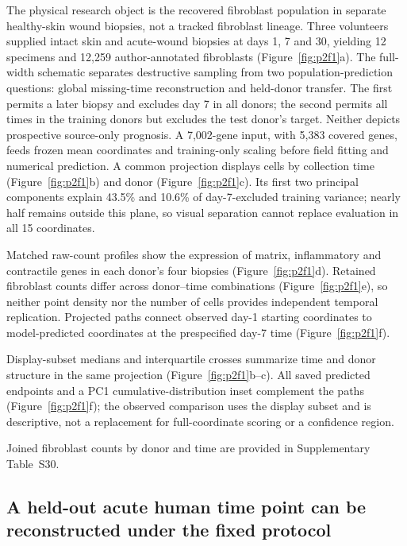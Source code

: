 \documentclass[10pt,a4paper]{article}
\begin{document}
The physical research object is the recovered fibroblast population in separate healthy-skin wound biopsies, not a tracked fibroblast lineage. Three volunteers supplied intact skin and acute-wound biopsies at days 1, 7 and 30, yielding 12 specimens and 12,259 author-annotated fibroblasts (Figure~\ref{fig:p2f1}a\label{call:p2f1}). The full-width schematic separates destructive sampling from two population-prediction questions: global missing-time reconstruction and held-donor transfer. The first permits a later biopsy and excludes day 7 in all donors; the second permits all times in the training donors but excludes the test donor's target. Neither depicts prospective source-only prognosis. A 7,002-gene input, with 5,383 covered genes, feeds frozen mean coordinates and training-only scaling before field fitting and numerical prediction. A common projection displays cells by collection time (Figure~\ref{fig:p2f1}b) and donor (Figure~\ref{fig:p2f1}c). Its first two principal components explain 43.5\% and 10.6\% of day-7-excluded training variance; nearly half remains outside this plane, so visual separation cannot replace evaluation in all 15 coordinates.


Matched raw-count profiles show the expression of matrix, inflammatory and contractile genes in each donor's four biopsies (Figure~\ref{fig:p2f1}d). Retained fibroblast counts differ across donor--time combinations (Figure~\ref{fig:p2f1}e), so neither point density nor the number of cells provides independent temporal replication. Projected paths connect observed day-1 starting coordinates to model-predicted coordinates at the prespecified day-7 time (Figure~\ref{fig:p2f1}f).

Display-subset medians and interquartile crosses summarize time and donor structure in the same projection (Figure~\ref{fig:p2f1}b--c). All saved predicted endpoints and a PC1 cumulative-distribution inset complement the paths (Figure~\ref{fig:p2f1}f); the observed comparison uses the display subset and is descriptive, not a replacement for full-coordinate scoring or a confidence region.

Joined fibroblast counts by donor and time are provided in Supplementary Table~S30.

\subsection{A held-out acute human time point can be reconstructed under the fixed protocol}
\end{document}
